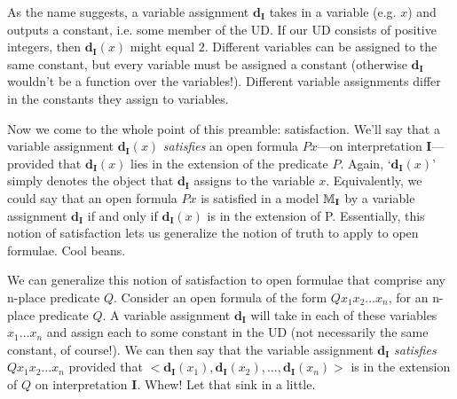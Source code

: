 {\color{black}As the name suggests, a variable assignment $\mathbf{d_I}$ takes in a variable (e.g. $x$) and outputs a constant, i.e. some member of the UD. If our UD consists of positive integers, then $\mathbf{d_I} (x)$ might equal $2$. Different variables can be assigned to the same constant, but every variable must be assigned a constant (otherwise $\mathbf{d_I}$ wouldn't be a function over the variables!). Different variable assignments differ in the constants they assign to variables.} 


{\color{black}Now we come to the whole point of this preamble: satisfaction. We'll say that a variable assignment $\mathbf{d_I} (x)$ \textit{satisfies} an open formula $Px$---on interpretation $\textbf{I}$---provided that $\mathbf{d_I}(x)$ lies in the extension of the predicate $P$. Again, `$\mathbf{d_I}(x)$' simply denotes the object that $\mathbf{d_I}$ assigns to the variable $x$. Equivalently, we could say that an open formula $Px$ is satisfied in a model $\mathbb{M}_{\mathbf{I}}$ by a variable assignment $\mathbf{d_I}$ if and only if $\mathbf{d_I}(x)$ is in the  extension of P. Essentially, this notion of satisfaction lets us generalize the notion of truth to apply to open formulae. Cool beans.}  

{\color{black}We can generalize this notion of satisfaction to open formulae that comprise any n-place predicate $Q$. Consider an open formula of the form $Qx_1x_2\dots x_n$, for an n-place predicate $Q$. A variable assignment $\mathbf{d_I}$ will take in each of these variables $x_1 \dots x_n$ and assign each to some constant in the UD (not necessarily the same constant, of course!). We can then say that the variable assignment $\mathbf{d_I}$ \textit{satisfies} $Qx_1 x_2 \dots x_n$ provided that $<\mathbf{d_I}(x_1), \mathbf{d_I}(x_2),\dots, \mathbf{d_I}(x_n)>$ is in the extension of $Q$ on interpretation \textbf{I}. Whew! Let that sink in a little.}



